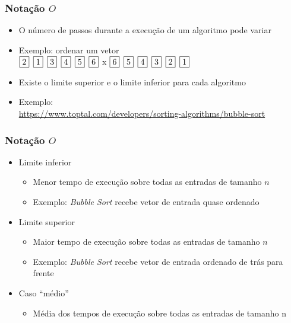 \documentclass[aspectratio=169]{beamer}
\begin{document}
\newcommand{\sep}{\hspace*{.5em}}
\begin{frame}\frametitle{Notação $O$}
\begin{itemize}
	\item O número de passos durante a execução de um algoritmo pode variar
	\item Exemplo: ordenar um vetor\\
\noindent $\fbox{2} \sep \fbox{1} \sep \fbox{3} \sep \fbox{4} \sep \fbox{5} \sep \fbox{6}$ \sep x \sep
          $\fbox{6} \sep \fbox{5} \sep \fbox{4} \sep \fbox{3} \sep \fbox{2} \sep \fbox{1}$
	\item Existe o limite superior e o limite inferior para cada algoritmo
	\item Exemplo:\\
\url{https://www.toptal.com/developers/sorting-algorithms/bubble-sort}
\end{itemize}
\end{frame}

\begin{frame}\frametitle{Notação $O$}
\begin{itemize}
	\item Limite inferior
	\begin{itemize}
		\item Menor tempo de execução sobre todas as entradas de tamanho $n$
		\item Exemplo: \emph{Bubble Sort} recebe vetor de entrada quase ordenado
	\end{itemize}
	\item Limite superior
	\begin{itemize}
		\item Maior tempo de execução sobre todas as entradas de tamanho $n$
		\item Exemplo: \emph{Bubble Sort} recebe vetor de entrada ordenado de trás para frente
	\end{itemize}
	\item Caso ``médio''
	\begin{itemize}
		\item Média dos tempos de execução sobre todas as entradas de tamanho n
	\end{itemize}
\end{itemize}
\end{frame}
\end{document}
